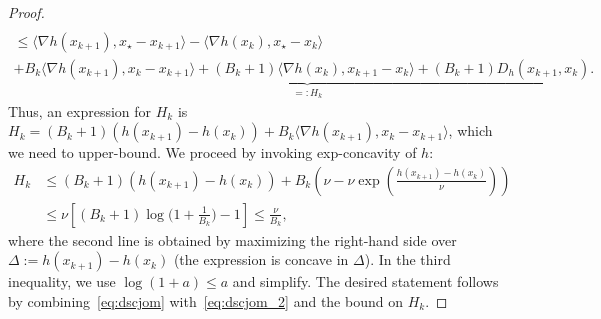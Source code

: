 \documentclass[10pt,a4paper]{amsart}
\newcommand{\coloneqq}{:=}
\newcommand{\ip}[2]{\langle #1, #2\rangle}
\renewcommand{\leq}{\leqslant}
\begin{document}
\begin{proof}
\begin{multline}
                \\
                \leq
                \ip{\nabla h(x_{k+1})}{  x_\star - x_{k+1}} -  \ip{\nabla h(x_{k})}{  x_\star  - x_{k}}
                \\
                + \underbrace{B_k\ip{\nabla h(x_{k+1})}{ x_k - x_{k+1}} +(B_k+1)                            \ip{\nabla h(x_k)}{ x_{k+1}-x_k } +(B_k+1)D_h(x_{k+1},x_k)}_{=:H_k}
                .
        \end{multline}
        Thus, an expression for $H_k$ is $ H_k = (B_k+1)(h(x_{k+1}) - h(x_k)) + B_k\ip{\nabla h(x_{k+1})}{ x_k-x_{k+1}}$, 
        which we need to upper-bound.
        We proceed by invoking exp-concavity of $h$:
        \begin{align*}
                H_k &\leq (B_k+1)(h(x_{k+1}) - h(x_k)) +B_k\left(\nu -  \nu \exp\left(\tfrac{h(x_{k+1})-h(x_{k})}{\nu}\right)\right)
                \\
                &\leq \nu \left[(B_k+1)\log\bigl(1+\tfrac 1{B_k}\bigr) - 1\right]
                 \leq \frac{\nu}{B_k},
        \end{align*}
        where the second line is obtained by maximizing the right-hand side over $\Delta\coloneqq h(x_{k+1})-h(x_k)$ (the expression is concave in $\Delta$).
        In the third inequality, we use $\log(1+a)\leq a$ and simplify.
        The desired statement follows by combining~\eqref{eq:dscjom} with~\eqref{eq:dscjom_2} and the bound on $H_k$.
\end{proof}
\end{document}

